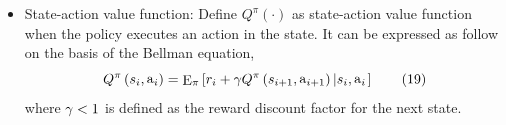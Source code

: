\documentclass[conference]{IEEEtran}
\begin{document}
\begin{itemize}
     the goal of the optimization problem, so the reward function ${{\rm{r}}_t}$
     is defined as the capacity of the system in the current state:
         \begin{equation}
          \begin{array}{l}
           {{\rm{r}}_i} = f({\bf{G}},{\bf{F}},A,{\bf{r}})\\
           {\kern 8pt} = \frac{1}{2}\log \det \left[ {{{\bf{H}}^T}{{\left( {{\sigma ^2}{{\bf{I}}_N}} \right)}^{ - 1}}{\bf{H}}} \right]{\kern 1pt}  + \sum\limits_{m = 1}^M {\log {A_m}} 
          \end{array}
         \tag{18}
         \label{eq18}
         \end{equation}
     \item State-action value function: Define ${Q^\pi }\left(  \cdot  \right)$
     as state-action value function when the policy executes an action in 
     the state. It can be expressed as follow on the basis of the Bellman 
     equation,
         \begin{equation}
         {Q^{\rm{\pi }}}\left( {{s_i},{{\mathop{\rm a}\nolimits} _i}} \right) = {{\mathop{\rm E}\nolimits} _{\rm{\pi }}}\left[ {{r_i} + {\rm{\gamma }}{Q^\pi }\left( {{s_{i + 1}},{{\mathop{\rm a}\nolimits} _{i + 1}}} \right)\left| {{s_i},{{\mathop{\rm a}\nolimits} _i}} \right.} \right]
         \tag{19}\label{eq19}
         \end{equation}
         where ${\rm{\gamma }} < 1$ is defined as the reward discount factor 
         for the next state.
         \end{itemize}
\end{document}
